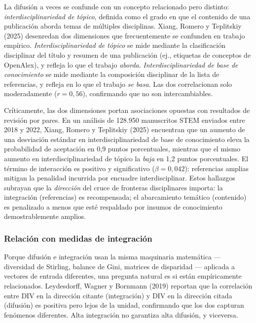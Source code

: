 \documentclass[
]{article}
\begin{document}
La difusión a veces se confunde con un concepto relacionado pero
distinto: \emph{interdisciplinariedad de tópico}, definida como el grado
en que el contenido de una publicación aborda temas de múltiples
disciplinas. Xiang, Romero y Teplitskiy (2025) desenredan dos
dimensiones que frecuentemente se confunden en trabajo empírico.
\emph{Interdisciplinariedad de tópico} se mide mediante la clasificación
disciplinar del título y resumen de una publicación (ej., etiquetas de
conceptos de OpenAlex), y refleja lo que el trabajo \emph{aborda}.
\emph{Interdisciplinariedad de base de conocimiento} se mide mediante la
composición disciplinar de la lista de referencias, y refleja en lo que
el trabajo \emph{se basa}. Las dos correlacionan solo moderadamente
(\(r = 0,56\)), confirmando que no son intercambiables.

Críticamente, las dos dimensiones portan asociaciones opuestas con
resultados de revisión por pares. En un análisis de 128.950 manuscritos
STEM enviados entre 2018 y 2022, Xiang, Romero y Teplitskiy (2025)
encuentran que un aumento de una desviación estándar en
interdisciplinariedad de base de conocimiento eleva la probabilidad de
aceptación en 0,9 puntos porcentuales, mientras que el mismo aumento en
interdisciplinariedad de tópico la \emph{baja} en 1,2 puntos
porcentuales. El término de interacción es positivo y significativo
(\(\beta = 0,042\)): referencias amplias mitigan la penalidad incurrida
por encuadre interdisciplinar. Estos hallazgos subrayan que la
\emph{dirección} del cruce de fronteras disciplinares importa: la
integración (referencias) es recompensada; el abarcamiento temático
(contenido) es penalizado a menos que esté respaldado por insumos de
conocimiento demostrablemente amplios.

\hypertarget{relaciuxf3n-con-medidas-de-integraciuxf3n}{%
\subsubsection{Relación con medidas de
integración}\label{relaciuxf3n-con-medidas-de-integraciuxf3n}}

Porque difusión e integración usan la misma maquinaria matemática ---
diversidad de Stirling, balance de Gini, matrices de disparidad ---
aplicada a vectores de entrada diferentes, una pregunta natural es si
están empíricamente relacionados. Leydesdorff, Wagner y Bornmann (2019)
reportan que la correlación entre DIV en la dirección citante
(integración) y DIV en la dirección citada (difusión) es positiva pero
lejos de la unidad, confirmando que los dos capturan fenómenos
diferentes. Alta integración no garantiza alta difusión, y viceversa.
\end{document}
